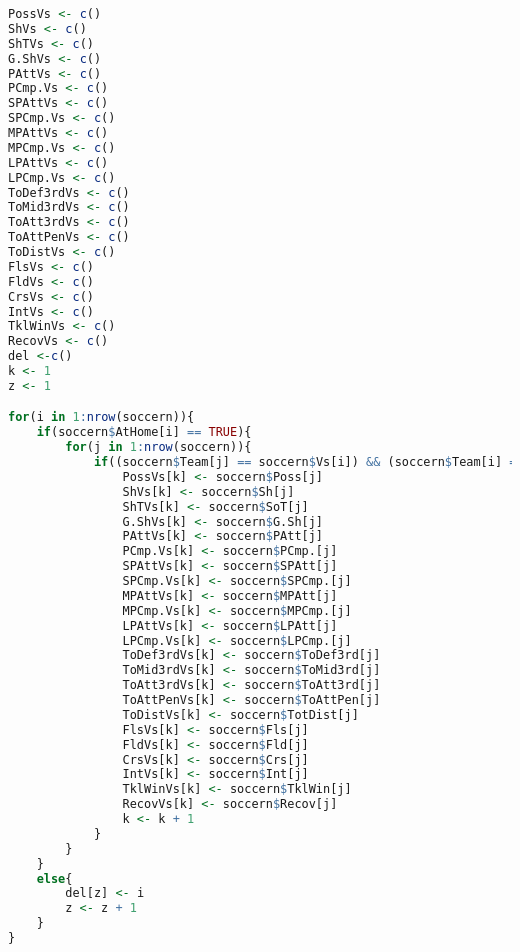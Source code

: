 \begin{lstlisting}[language=R]
PossVs <- c()
ShVs <- c()
ShTVs <- c()
G.ShVs <- c()
PAttVs <- c()
PCmp.Vs <- c()
SPAttVs <- c()
SPCmp.Vs <- c()
MPAttVs <- c()
MPCmp.Vs <- c()
LPAttVs <- c()
LPCmp.Vs <- c()
ToDef3rdVs <- c()
ToMid3rdVs <- c()
ToAtt3rdVs <- c()
ToAttPenVs <- c()
ToDistVs <- c()
FlsVs <- c()
FldVs <- c()
CrsVs <- c()
IntVs <- c()
TklWinVs <- c()
RecovVs <- c()
del <-c()
k <- 1
z <- 1

for(i in 1:nrow(soccern)){
	if(soccern$AtHome[i] == TRUE){
		for(j in 1:nrow(soccern)){
			if((soccern$Team[j] == soccern$Vs[i]) && (soccern$Team[i] == soccern$Vs[j]) && (soccern$AtHome[j] == FALSE)){
				PossVs[k] <- soccern$Poss[j]
				ShVs[k] <- soccern$Sh[j]
				ShTVs[k] <- soccern$SoT[j]
				G.ShVs[k] <- soccern$G.Sh[j]
				PAttVs[k] <- soccern$PAtt[j]
				PCmp.Vs[k] <- soccern$PCmp.[j]
				SPAttVs[k] <- soccern$SPAtt[j]
				SPCmp.Vs[k] <- soccern$SPCmp.[j]
				MPAttVs[k] <- soccern$MPAtt[j]
				MPCmp.Vs[k] <- soccern$MPCmp.[j]
				LPAttVs[k] <- soccern$LPAtt[j]
				LPCmp.Vs[k] <- soccern$LPCmp.[j]
				ToDef3rdVs[k] <- soccern$ToDef3rd[j]
				ToMid3rdVs[k] <- soccern$ToMid3rd[j]
				ToAtt3rdVs[k] <- soccern$ToAtt3rd[j]
				ToAttPenVs[k] <- soccern$ToAttPen[j]
				ToDistVs[k] <- soccern$TotDist[j]
				FlsVs[k] <- soccern$Fls[j]
				FldVs[k] <- soccern$Fld[j]
				CrsVs[k] <- soccern$Crs[j]
				IntVs[k] <- soccern$Int[j]
				TklWinVs[k] <- soccern$TklWin[j]
				RecovVs[k] <- soccern$Recov[j]
				k <- k + 1
			}      
		}
	}
	else{
		del[z] <- i
		z <- z + 1
	}
}
\end{lstlisting}
\bigskip

